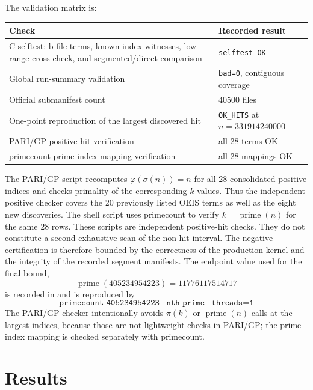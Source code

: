 \documentclass[11pt]{article}
\theoremstyle{definition}
\theoremstyle{remark}
\begin{document}
The validation matrix is:
\begin{center}
\begin{tabular}{>{\raggedright\arraybackslash}p{}
>{\raggedright\arraybackslash}p{}}
\toprule
\textbf{Check} & \textbf{Recorded result}\\
\midrule
C selftest: b-file terms, known index witnesses, low-range cross-check,
and segmented/direct comparison & \texttt{selftest OK}\\
Global run-summary validation & \texttt{bad=0}, contiguous coverage\\
Official submanifest count & \(40500\) files\\
One-point reproduction of the largest discovered hit
& \texttt{OK\_HITS} at \(n=331914240000\)\\
PARI/GP positive-hit verification
& all 28 terms OK\\
primecount prime-index mapping verification
& all 28 mappings OK\\
\bottomrule
\end{tabular}
\end{center}

The PARI/GP script  recomputes
\(\varphi(\sigma(n))=n\) for all 28 consolidated positive indices and checks
primality of the corresponding \(k\)-values.  Thus the independent
positive checker covers the 20 previously listed OEIS terms as well as
the eight new discoveries.  The shell script
 uses primecount to verify
\(k=\operatorname{prime}(n)\) for the same 28 rows.  These scripts are
independent positive-hit checks.  They do not constitute a second
exhaustive scan of the non-hit interval.  The negative certification is
therefore bounded by the correctness of the production kernel and the
integrity of the recorded segment manifests.
The endpoint value used for the final bound,
\[
  \operatorname{prime}(405234954223)=11776117514717
\]
is recorded in  and is reproduced
by
\[
  \texttt{primecount 405234954223 --nth-prime --threads=1}
\]
The PARI/GP checker intentionally avoids \(\pi(k)\) or
\(\operatorname{prime}(n)\) calls at the largest indices, because those
are not lightweight checks in PARI/GP; the prime-index mapping is checked
separately with primecount.

\section{Results}
\end{document}
